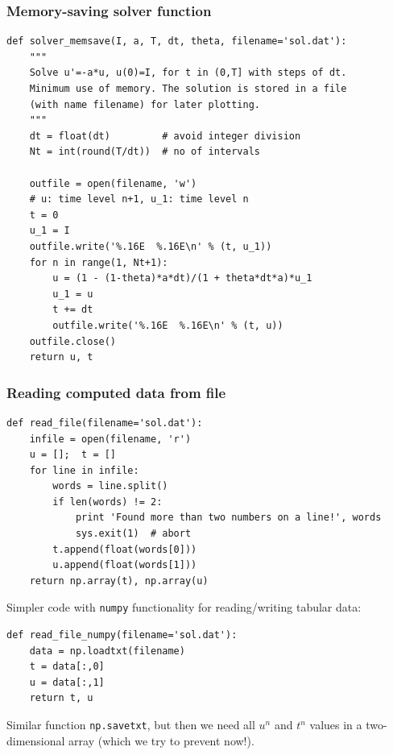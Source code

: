 \documentclass{beamer}
\begin{document}
\begin{frame}
\frametitle{Memory-saving solver function}

\begin{verbatim}
def solver_memsave(I, a, T, dt, theta, filename='sol.dat'):
    """
    Solve u'=-a*u, u(0)=I, for t in (0,T] with steps of dt.
    Minimum use of memory. The solution is stored in a file
    (with name filename) for later plotting.
    """
    dt = float(dt)         # avoid integer division
    Nt = int(round(T/dt))  # no of intervals

    outfile = open(filename, 'w')
    # u: time level n+1, u_1: time level n
    t = 0
    u_1 = I
    outfile.write('%.16E  %.16E\n' % (t, u_1))
    for n in range(1, Nt+1):
        u = (1 - (1-theta)*a*dt)/(1 + theta*dt*a)*u_1
        u_1 = u
        t += dt
        outfile.write('%.16E  %.16E\n' % (t, u))
    outfile.close()
    return u, t
\end{verbatim}
\end{frame}

\begin{frame}
\frametitle{Reading computed data from file}

\begin{verbatim}
def read_file(filename='sol.dat'):
    infile = open(filename, 'r')
    u = [];  t = []
    for line in infile:
        words = line.split()
        if len(words) != 2:
            print 'Found more than two numbers on a line!', words
            sys.exit(1)  # abort
        t.append(float(words[0]))
        u.append(float(words[1]))
    return np.array(t), np.array(u)
\end{verbatim}

Simpler code with \texttt{numpy} functionality for reading/writing tabular data:

\begin{verbatim}
def read_file_numpy(filename='sol.dat'):
    data = np.loadtxt(filename)
    t = data[:,0]
    u = data[:,1]
    return t, u
\end{verbatim}

Similar function \texttt{np.savetxt}, but then we need all $u^n$ and $t^n$ values
in a two-dimensional array (which we try to prevent now!).
\end{frame}
\end{document}
